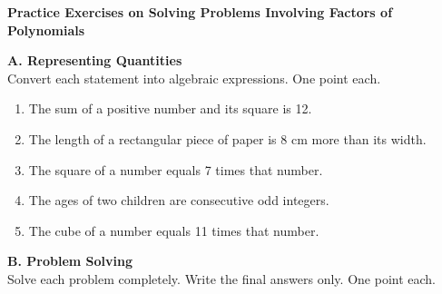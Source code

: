 

\def \Lesson {Solving Problems Involving Factors of Polynomials}


	\begin{center}
		\textbf{\large Practice Exercises on \Lesson}
	\end{center}

    \vspace*{2em}

    \noindent \textbf{A. Representing Quantities} \\
    
    Convert each statement into algebraic expressions. One point each.
    
    \begin{enumerate}
    	\item The sum of a positive number and its square is 12.
    	\item The length of a rectangular piece of paper is 8 cm more than its width. 
    	\item The square of a number equals 7 times that number. 
    	\item The ages of two children are consecutive odd integers. 
    	\item The cube of a number equals 11 times that number. 
    \end{enumerate}

    \vspace*{1.3ex}

    \noindent \textbf{B. Problem Solving} \\
    
    Solve each problem completely. Write the final answers only. One point each.
    
